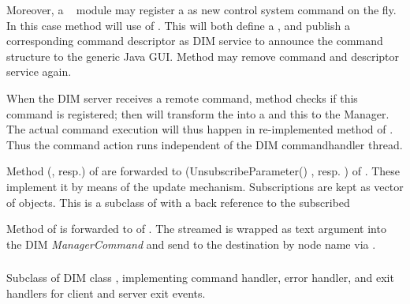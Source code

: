 \begin{compactenum}
Moreover, a \dabc~ module may register a 
 as new control system command on the fly.
In this case  method
 will use
 of .
This will both define  a , and
publish a corresponding command descriptor as DIM service to
announce the command structure to the generic Java GUI.
Method  may remove command and 
descriptor service again.


When the DIM server receives a remote command, 
method  checks if this command
is registered; then  will transform the
 into a  and 
this to the Manager. The actual command execution will thus happen
in re-implemented method  of .
Thus the command action runs independent of the DIM commandhandler thread.

\item {}
Method  (, resp.) of  
are forwarded to  (UnsubscribeParameter() , resp. ) 
of .
These implement it by means of the  update mechanism. 
Subscriptions are kept as vector of  objects.
This is a subclass of  with a back reference to the subscribed 


\item {}   
Method  of     
is forwarded to   of .
The streamed  is wrapped as text argument
into the DIM {\em ManagerCommand} and send to the destination
by node name via .    
    
    
    
\end{compactenum}    

\subsubsection{}
Subclass of DIM class , implementing command handler, error handler, and exit handlers for client and server exit events.

